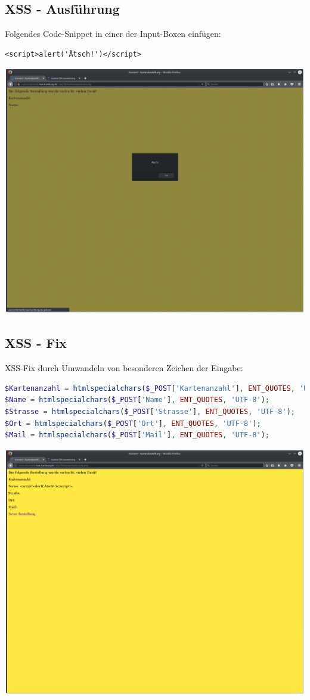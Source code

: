 \documentclass[a4paper,10pt]{article}
\begin{document}
\subsection{XSS - Ausführung}
Folgendes Code-Snippet in einer der Input-Boxen einfügen:
\begin{verbatim}
<script>alert('Ätsch!')</script>
\end{verbatim}
\includegraphics[scale=0.3]{xss.png}
\subsection{XSS - Fix}
XSS-Fix durch Umwandeln von besonderen Zeichen der Eingabe: 
\begin{lstlisting}[language=php]
$Kartenanzahl = htmlspecialchars($_POST['Kartenanzahl'], ENT_QUOTES, 'UTF-8');
$Name = htmlspecialchars($_POST['Name'], ENT_QUOTES, 'UTF-8');
$Strasse = htmlspecialchars($_POST['Strasse'], ENT_QUOTES, 'UTF-8');
$Ort = htmlspecialchars($_POST['Ort'], ENT_QUOTES, 'UTF-8');
$Mail = htmlspecialchars($_POST['Mail'], ENT_QUOTES, 'UTF-8');
\end{lstlisting}
\includegraphics[scale=0.3]{xss_fixed.png}
\end{document}
